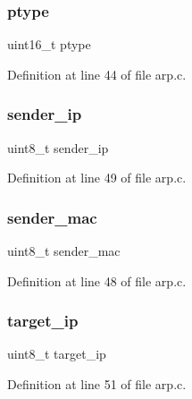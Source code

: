 \subsubsection{\texorpdfstring{ptype}{ptype}}
{\footnotesize\ttfamily uint16\+\_\+t ptype}



Definition at line 44 of file arp.\+c.

\hypertarget{struct__arp__hdr_a551d82aeea5aa701b04c92f771a78c80}{}\label{struct__arp__hdr_a551d82aeea5aa701b04c92f771a78c80} 
\subsubsection{\texorpdfstring{sender\+\_\+ip}{sender\_ip}}
{\footnotesize\ttfamily uint8\+\_\+t sender\+\_\+ip}



Definition at line 49 of file arp.\+c.

\hypertarget{struct__arp__hdr_ae9f96a8fe1c86c1fcb056689a4063d0d}{}\label{struct__arp__hdr_ae9f96a8fe1c86c1fcb056689a4063d0d} 
\subsubsection{\texorpdfstring{sender\+\_\+mac}{sender\_mac}}
{\footnotesize\ttfamily uint8\+\_\+t sender\+\_\+mac}



Definition at line 48 of file arp.\+c.

\hypertarget{struct__arp__hdr_ad62555f6b931e4d547077cbf904bc6e3}{}\label{struct__arp__hdr_ad62555f6b931e4d547077cbf904bc6e3} 
\subsubsection{\texorpdfstring{target\+\_\+ip}{target\_ip}}
{\footnotesize\ttfamily uint8\+\_\+t target\+\_\+ip}



Definition at line 51 of file arp.\+c.

\hypertarget{struct__arp__hdr_a493fbae2e8be850f95e56b528f25f0ce}{}\label{struct__arp__hdr_a493fbae2e8be850f95e56b528f25f0ce} 
